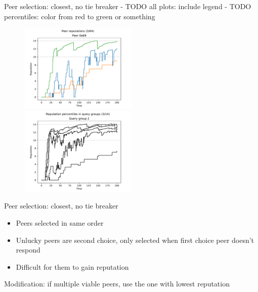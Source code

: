 \documentclass[presentation,english,usenames,dvipsnames]{beamer}
\begin{document}
\begin{frame}{Peer selection: closest, no tie breaker}
- TODO all plots: include legend
- TODO percentiles: color from red to green or something
  \begin{figure}
    \centering
    \includegraphics[width=0.5\textwidth]{figures/selection_overlap_peer_reps_3_of_64}\pause%
    \includegraphics[width=0.5\textwidth]{figures/selection_overlap_rep_percs_3_of_14}
  \end{figure}
\end{frame}

\begin{frame}{Peer selection: closest, no tie breaker}
  \begin{itemize}
    \item Peers selected in same order
    \item Unlucky peers are second choice, only selected when first choice peer
          doesn't respond
    \item Difficult for them to gain reputation
  \end{itemize}

  \pause

  \begin{block}{}
    Modification: if multiple viable peers, use the one with lowest reputation
  \end{block}
\end{frame}
\end{document}
